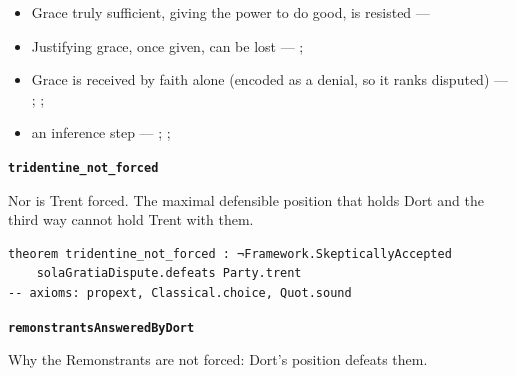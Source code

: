 \documentclass[11pt]{article}
\begin{document}
\begin{itemize}
\begin{itemize}
\item Grace truly sufficient, giving the power to do good, is resisted --- \cite[ch. VI]{garrigou-lagrange-grace-1952}
\item Justifying grace, once given, can be lost --- \cite[II-II q.24 a.11]{aquinas-summa-1920}; \cite[Trent, Session VI (1547), canon 23]{tanner-decrees-1990}
\item Grace is received by faith alone (encoded as a denial, so it ranks disputed) --- \cite[II-II q.4 a.3]{aquinas-summa-1920}; \cite[I-II q.113 a.4 ad 1]{aquinas-summa-1920}; \cite[Trent, Session VI (1547), canon 9]{tanner-decrees-1990}
\item an inference step --- \cite{pohle-molinism-1911}; \cite[I-II q.112 a.3]{aquinas-summa-1920}; \cite[ch. VII]{garrigou-lagrange-grace-1952}
\end{itemize}
\end{itemize}
\par\medskip\noindent\textbf{\texttt{tridentine\_\allowbreak{}not\_\allowbreak{}forced}}\par\nobreak\noindent
Nor is Trent forced. The maximal defensible position that holds Dort and the third way cannot hold Trent with them.

{\small\begin{verbatim}
theorem tridentine_not_forced : ¬Framework.SkepticallyAccepted
    solaGratiaDispute.defeats Party.trent
-- axioms: propext, Classical.choice, Quot.sound
\end{verbatim}}
\par\medskip\noindent\textbf{\texttt{remonstrants\allowbreak{}Answered\allowbreak{}By\allowbreak{}Dort}}\par\nobreak\noindent
Why the Remonstrants are not forced: Dort’s position defeats them.
\end{document}
